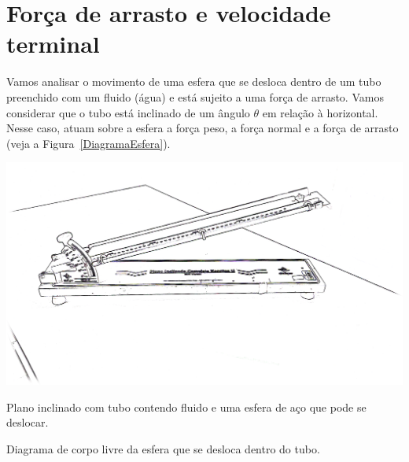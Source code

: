\section{Força de arrasto e velocidade terminal}
\label{SecaoF_a}

Vamos analisar o movimento de uma esfera que se desloca dentro de um tubo preenchido com um fluido (água) e está sujeito a uma força de arrasto. Vamos considerar que o tubo está inclinado de um ângulo $\theta$ em relação à horizontal. Nesse caso, atuam sobre a esfera a força peso, a força normal e a força de arrasto (veja a Figura~\ref{DiagramaEsfera}).

\begin{marginfigure}
	\includegraphics[width=\textwidth]{Ilustrations/Arrasto.png}
	\caption{Plano inclinado com tubo contendo fluido e uma esfera de aço que pode se deslocar.}
\end{marginfigure}

\begin{marginfigure}
\centering
{}
\caption{Diagrama de corpo livre da esfera que se desloca dentro do tubo.}
\label{DiagramaEsfera}
\end{marginfigure}

